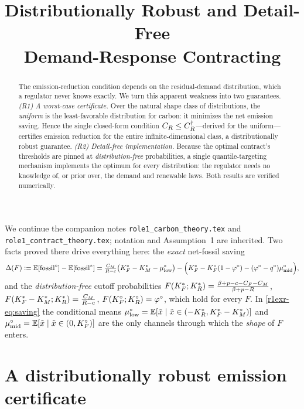 \title[Robust and Detail-Free Demand-Response Contracting]
{Distributionally Robust and Detail-Free\\ Demand-Response Contracting}



\begin{abstract}
The emission-reduction condition depends on the residual-demand distribution,
which a regulator never knows exactly. We turn this apparent weakness into two
guarantees. \emph{(R1) A worst-case certificate.} Over the natural shape class of
distributions, the \emph{uniform} is the least-favorable distribution for carbon:
it minimizes the net emission saving. Hence the single closed-form condition
$C_R\le C_R^{\dagger}$---derived for the uniform---certifies emission reduction for
the entire infinite-dimensional class, a distributionally robust guarantee.
\emph{(R2) Detail-free implementation.} Because the optimal contract's thresholds
are pinned at \emph{distribution-free} probabilities, a single quantile-targeting
mechanism implements the optimum for every distribution: the regulator needs no
knowledge of, or prior over, the demand and renewable laws. Both results are
verified numerically.
\end{abstract}



We continue the companion notes \texttt{role1\_carbon\_theory.tex} and
\texttt{role1\_contract\_theory.tex}; notation and Assumption~1 are inherited.
Two facts proved there drive everything here:
the \emph{exact} net-fossil saving
\begin{equation}\label{r1exr-eq:saving}
  \Delta(F)\vcentcolon=\mathbb{E}[\text{fossil}^{\circ}]-\mathbb{E}[\text{fossil}^{*}]
  =\tfrac{C_M}{R-c}\big(K_F^{*}-K_M^{*}-\mu^{*}_{\mathrm{low}}\big)
   -\Big(K_F^{*}-K_F^{\circ}(1-\varphi^{\circ})-(\varphi^{\circ}-q^{\circ})\mu^{\circ}_{\mathrm{mid}}\Big),
\end{equation}
and the \emph{distribution-free} cutoff probabilities
$F(K_F^{*};K_R^{*})=\frac{\beta+p-c-C_F-C_M}{\beta+p-R}$,
$F(K_F^{*}-K_M^{*};K_R^{*})=\frac{C_M}{R-c}$, $F(K_F^{\circ};K_R^{\circ})=\varphi^{\circ}$,
which hold for every $F$. In \eqref{r1exr-eq:saving} the conditional means
$\mu^{*}_{\mathrm{low}}=\mathbb{E}[\tilde x\mid \tilde x\in(-K_R^{*},K_F^{*}-K_M^{*})]$ and
$\mu^{\circ}_{\mathrm{mid}}=\mathbb{E}[\tilde x\mid \tilde x\in(0,K_F^{\circ})]$ are the only
channels through which the \emph{shape} of $F$ enters.

\section{A distributionally robust emission certificate}\label{r1exr-sec:robust}

